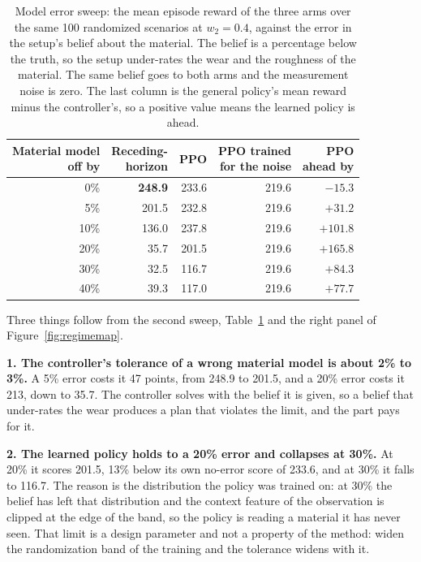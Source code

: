 \documentclass[11pt,a4paper]{article}
\newcommand{\alert}[1]{\textcolor{IITGold}{\textbf{#1}}}
\begin{document}
\begin{table}[H]
\centering
\caption{Model error sweep: the mean episode reward of the three arms over the same 100 randomized scenarios at $w_2 = 0.4$, against the error in the setup's belief about the material. The belief is a percentage below the truth, so the setup under-rates the wear and the roughness of the material. The same belief goes to both arms and the measurement noise is zero. The last column is the general policy's mean reward minus the controller's, so a positive value means the learned policy is ahead.}
\label{tab:regimemodel}
\small
\setlength{\tabcolsep}{5pt}
\begin{tabular}{@{}rrrrr@{}}
\toprule
\makecell{\textbf{Material model}\\\textbf{off by}} & \makecell{\textbf{Receding-}\\\textbf{horizon}} & \textbf{PPO} & \makecell{\textbf{PPO trained}\\\textbf{for the noise}} & \makecell{\textbf{PPO}\\\textbf{ahead by}} \\
\midrule
0\%  & \alert{248.9} & 233.6 & 219.6 & $-15.3$ \\
5\%  & 201.5 & 232.8 & 219.6 & $+31.2$ \\
10\% & 136.0 & 237.8 & 219.6 & \alert{$+101.8$} \\
20\% & 35.7  & 201.5 & 219.6 & $+165.8$ \\
30\% & 32.5  & 116.7 & 219.6 & $+84.3$ \\
40\% & 39.3  & 117.0 & 219.6 & $+77.7$ \\
\bottomrule
\end{tabular}
\end{table}

Three things follow from the second sweep, Table~\ref{tab:regimemodel} and the right panel of Figure~\ref{fig:regimemap}.

\textbf{1. The controller's tolerance of a wrong material model is about 2\% to 3\%.} A 5\% error costs it 47 points, from 248.9 to 201.5, and a 20\% error costs it 213, down to 35.7. The controller solves with the belief it is given, so a belief that under-rates the wear produces a plan that violates the limit, and the part pays for it.

\textbf{2. The learned policy holds to a 20\% error and collapses at 30\%.} At 20\% it scores 201.5, 13\% below its own no-error score of 233.6, and at 30\% it falls to 116.7. The reason is the distribution the policy was trained on: at 30\% the belief has left that distribution and the context feature of the observation is clipped at the edge of the band, so the policy is reading a material it has never seen. That limit is a design parameter and not a property of the method: widen the randomization band of the training and the tolerance widens with it.
\end{document}
